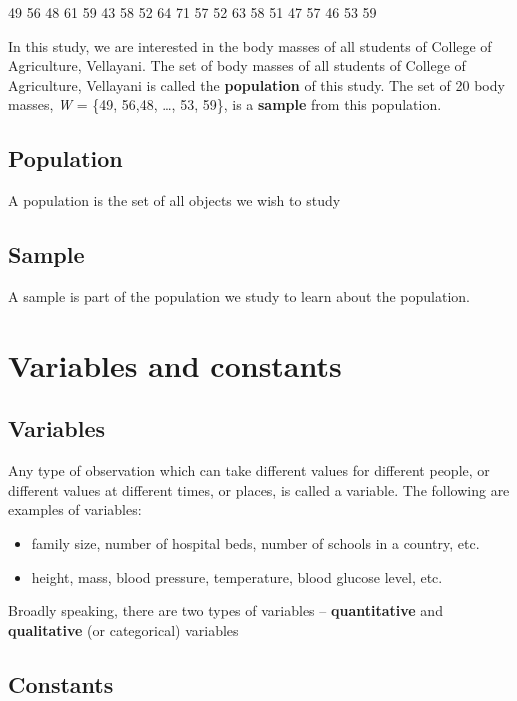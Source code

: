 \documentclass[
]{book}
\begin{document}
49 56 48 61 59 43 58 52 64 71 57 52 63 58 51 47 57 46 53 59

In this study, we are interested in the body masses of all students of College of Agriculture, Vellayani. The set of body masses of all students of College of Agriculture, Vellayani is called the \textbf{population} of this study. The set of 20 body masses, \emph{W} = \{49, 56,48, \ldots, 53, 59\}, is a \textbf{sample} from this population.

\hypertarget{population}{%
\subsection{Population}\label{population}}

A population is the set of all objects we wish to study

\hypertarget{sample}{%
\subsection{Sample}\label{sample}}

A sample is part of the population we study to learn about the population.

\hypertarget{variables-and-constants}{%
\section{Variables and constants}\label{variables-and-constants}}

\hypertarget{variables}{%
\subsection{Variables}\label{variables}}

Any type of observation which can take different values for different people, or different values at different times, or places, is called a variable. The following are examples of variables:

\begin{itemize}
\item
  family size, number of hospital beds, number of schools in a country, etc.
\item
  height, mass, blood pressure, temperature, blood glucose level, etc.
\end{itemize}

Broadly speaking, there are two types of variables -- \textbf{quantitative} and \textbf{qualitative} (or categorical) variables

\hypertarget{constants}{%
\subsection{Constants}\label{constants}}
\end{document}
